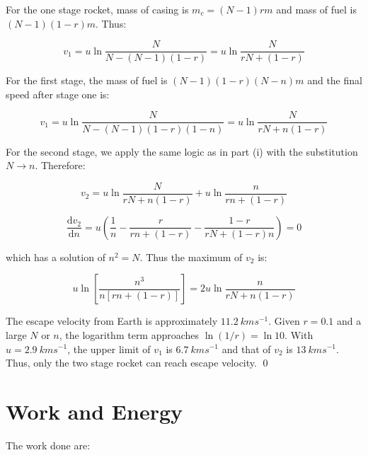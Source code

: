 \documentclass[12pt]{article}
\begin{document}
For the one stage rocket, mass of casing is $m_{c} = (N-1)rm$ and mass of fuel is $(N-1)(1-r)m$. Thus:

\begin{equation}
    v_{1} = u \ln{\frac{N}{N - (N-1)(1-r)}} = u \ln{\frac{N}{rN + (1-r)}}
\end{equation}

For the first stage, the mass of fuel is $(N-1)(1-r)(N-n)m$ and the final speed after stage one is:

\begin{equation}
    v_{1} = u \ln{\frac{N}{N - (N-1)(1-r)(1-n)}} = u \ln{\frac{N}{rN + n(1-r)}}
\end{equation}

For the second stage, we apply the same logic as in part (i) with the substitution $N \to n$. Therefore:

\begin{equation}
    v_{2} = u \ln{\frac{N}{rN + n(1-r)}} + u \ln{\frac{n}{rn + (1-r)}}
\end{equation}


\begin{equation}
    \frac{\mathrm{d}v_{2}}{\mathrm{d}n} = u \left( \frac{1}{n} - \frac{r}{rn + (1-r)} - \frac{1-r}{rN + (1-r)n} \right) = 0
\end{equation}

which has a solution of $n^{2} = N$. Thus the maximum of $v_{2}$ is:

\begin{equation}
    u \ln \left[ \frac{n^{3}}{n[rn + (1-r)]} \right] = 2u \ln{\frac{n}{rN + n(1-r)}}
\end{equation}

The escape velocity from Earth is approximately $\qty{11.2}{kms^{-1}}$. Given $r = 0.1$ and a large $N$ or $n$, the logarithm term approaches $\ln{(1/r)} = \ln{10}$. With $u = \qty{2.9}{kms^{-1}}$, the upper limit of $v_{1}$ is $\qty{6.7}{kms^{-1}}$ and that of $v_{2}$ is $\qty{13}{kms^{-1}}$. Thus, only the two stage rocket can reach escape velocity.
\qed


\pagebreak
\section*{Work and Energy}


The work done are:
\end{document}
